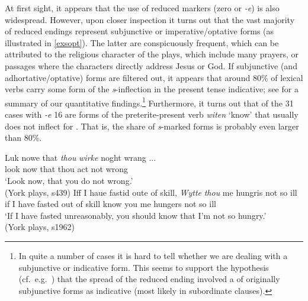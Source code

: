 \documentclass[output=paper]{langsci/langscibook}
\begin{document}
At first sight, it appears that the use of reduced markers (zero or \emph{-e})
is also widespread. However, upon closer inspection it turns out that the vast
majority of reduced endings represent subjunctive or imperative/optative forms
(as illustrated in \ref{exsopt}). The latter are conspicuously frequent,
which can be attributed to the religious character of the plays, which include
many prayers, or passages where the characters directly address Jesus or God.
If subjunctive (and adhortative/optative) forms are filtered out, it appears
that around 80\% of \Ssg{} lexical verbs carry some form of the
\emph{s}-inflection in the present tense indicative; see
 for a summary of our quantitative
findings.\footnote{In quite a number of cases it is hard to tell whether we
    are dealing with a subjunctive or indicative form. This seems to support the
    hypothesis (cf.\ e.g.\ \citealt{Sweet:1871}) that the spread of the reduced ending involved
    a  of originally subjunctive forms as indicative (most likely in
subordinate clauses).} Furthermore, it turns out that of the 31 cases with
\emph{-e} 16 are forms of the preterite-present verb \emph{witen} `know' that
usually does not inflect for \Ssg{}. That is, the share of \emph{s}-marked
forms is probably even larger than 80\%.

\ea
\label{exsopt}
\ea \gll Luk nowe that \textit{thou} \textit{wirke} noght wrang ...\\
look now that thou act not wrong \\
\glt `Look now, that you do not wrong.'\\
(York plays, s439)
\ex \gll Iff I haue fastid oute of skill, \textit{Wytte} \textit{thou} me hungris not so ill\\
if I have fasted out of skill know you me hungers not so ill\\
\glt `If I have fasted unreasonably, you should know that I'm not so hungry.'\\
(York plays, s1962)
\z
\z

\begin{table}
\caption{Verbal endings of the second person present tense indicative in the
\emph{York plays} (lexical verbs only)\label{table1-2ndps-lexical-verbs}}
\end{table}
\end{document}
